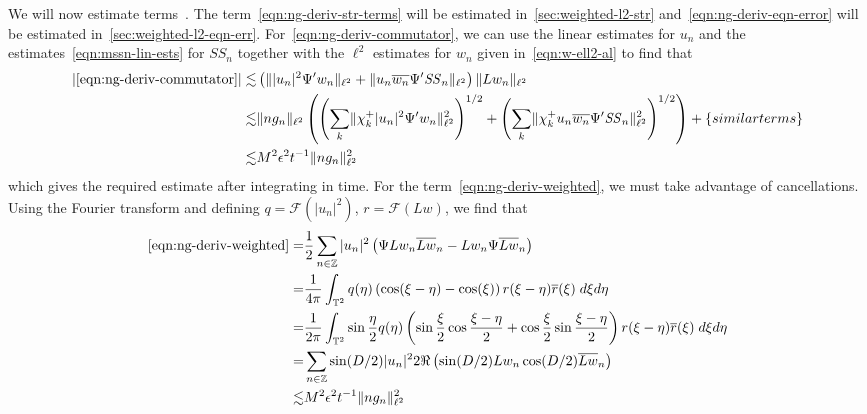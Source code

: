 \documentclass[letterpaper, reqno,final]{amsart}
\newcommand{\bbZ}{\mathbb{Z}}
\newcommand{\bbT}{\mathbb{T}}
\newcommand{\mSS}{\mathit{SS}}
\newcommand{\discrAvg}{\Psi}
\newcommand{\btext}[1]{\left\{\textup{#1}\right\}}
\newcommand{\bsim}{\btext{similar terms}}
\begin{document}
We will now estimate terms~.  The term~\eqref{eqn:ng-deriv-str-terms} will be estimated in~\cref{sec:weighted-l2-str} and~\eqref{eqn:ng-deriv-eqn-error} will be estimated in~\cref{sec:weighted-l2-eqn-err}.  For~\eqref{eqn:ng-deriv-commutator}, we can use the linear estimates for $u_n$ and the estimates~\eqref{eqn:mssn-lin-ests} for $\mSS_n$ together with the  $\ell^2$ estimates for $w_n$ given in~\eqref{eqn:w-ell2-al} to find that
\begin{equation*}\begin{split}
    |\eqref{eqn:ng-deriv-commutator}| \lesssim& \left(\lVert |u_n|^2 \Psi'w_{n} \rVert_{\ell^2} + \lVert u_n \overline{w_n} \Psi'\mSS_{n}\rVert_{\ell^2}\right) \lVert Lw_n \rVert_{\ell^2}\\
    \lesssim& \lVert ng_n \rVert_{\ell^2}\left( \left(\sum_{k} \lVert \chi_{k}^+ |u_n|^2 \Psi'w_{n} \rVert_{\ell^2}^2\right)^{1/2} + \left( \sum_{k} \lVert \chi_{k}^+ u_n \overline{w_n} \Psi'\mSS_{n}\rVert_{\ell^2}^2\right)^{1/2}\right) + \bsim\\
    \lesssim& M^2 \epsilon^2 t^{-1}\lVert ng_n \rVert_{\ell^2}^2
\end{split}\end{equation*}
which gives the required estimate after integrating in time.  For the term~\eqref{eqn:ng-deriv-weighted}, we must take advantage of cancellations.  Using the Fourier transform and defining $q =  \mathcal{F}(|u_n|^2)$, $r = \mathcal{F}(Lw)$, we find that
\begin{equation*}\begin{split}
    \eqref{eqn:ng-deriv-weighted} =& \frac{1}{2}\sum_{n \in \bbZ} |u_n|^2 \left( \discrAvg Lw_n \overline{Lw}_n - Lw_n \discrAvg \overline{Lw}_n\right) \\
    =& \frac{1}{4\pi} \int_{\bbT^2} q(\eta) \left(\cos(\xi - \eta) - \cos(\xi)\right) r(\xi - \eta) \overline{r}(\xi) \;d\xi d\eta\\
    =& \frac{1}{2\pi}\int_{\bbT^2} \sin \frac{\eta}{2} q(\eta) \left(\sin \frac{\xi}{2} \cos \frac{\xi - \eta}{2} + \cos\frac{\xi}{2} \sin \frac{\xi - \eta}{2}\right) r(\xi - \eta) \overline{r}(\xi) \;d\xi d\eta\\
    =& \sum_{n \in \bbZ} \sin(D/2) |u_n|^2 2\Re \left(\sin(D/2)Lw_n \cos(D/2) \overline{Lw}_n\right)\\
    \lesssim& M^2 \epsilon^2 t^{-1}\lVert ng_n \rVert_{\ell^2}^2
\end{split}\end{equation*}
\end{document}
